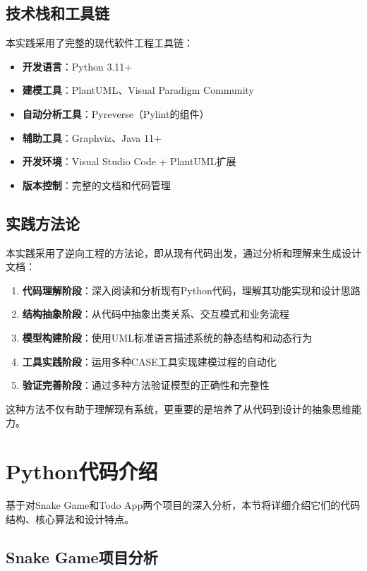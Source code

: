 \documentclass[a4paper]{article}
\begin{document}
\subsection{技术栈和工具链}

本实践采用了完整的现代软件工程工具链：

\begin{itemize}
    \item \textbf{开发语言}：Python 3.11+
    \item \textbf{建模工具}：PlantUML、Visual Paradigm Community
    \item \textbf{自动分析工具}：Pyreverse（Pylint的组件）
    \item \textbf{辅助工具}：Graphviz、Java 11+
    \item \textbf{开发环境}：Visual Studio Code + PlantUML扩展
    \item \textbf{版本控制}：完整的文档和代码管理
\end{itemize}

\subsection{实践方法论}

本实践采用了逆向工程的方法论，即从现有代码出发，通过分析和理解来生成设计文档：

\begin{enumerate}
    \item \textbf{代码理解阶段}：深入阅读和分析现有Python代码，理解其功能实现和设计思路
    \item \textbf{结构抽象阶段}：从代码中抽象出类关系、交互模式和业务流程
    \item \textbf{模型构建阶段}：使用UML标准语言描述系统的静态结构和动态行为
    \item \textbf{工具实践阶段}：运用多种CASE工具实现建模过程的自动化
    \item \textbf{验证完善阶段}：通过多种方法验证模型的正确性和完整性
\end{enumerate}

这种方法不仅有助于理解现有系统，更重要的是培养了从代码到设计的抽象思维能力。

\section{Python代码介绍}

基于对Snake Game和Todo App两个项目的深入分析，本节将详细介绍它们的代码结构、核心算法和设计特点。

\subsection{Snake Game项目分析}
\end{document}
